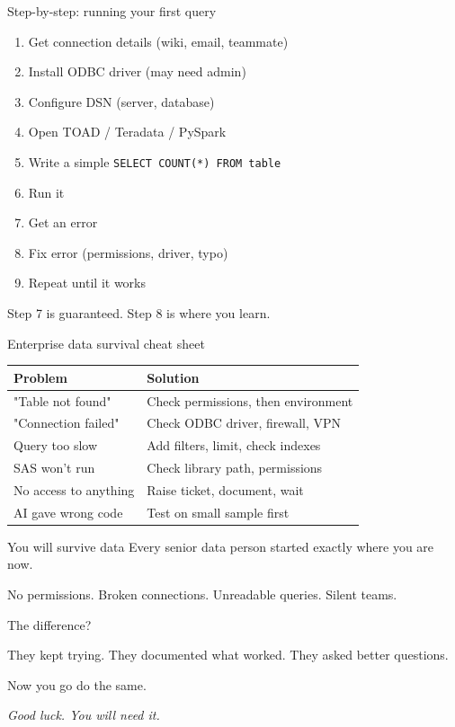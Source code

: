 \documentclass[aspectratio=169, 11pt]{beamer}
\begin{document}
	\begin{frame}{Step-by-step: running your first query}
		\tiny
		\begin{enumerate}
			\item Get connection details (wiki, email, teammate)
			\item Install ODBC driver (may need admin)
			\item Configure DSN (server, database)
			\item Open TOAD / Teradata / PySpark
			\item Write a simple \texttt{SELECT COUNT(*) FROM table}
			\item Run it
			\item Get an error
			\item Fix error (permissions, driver, typo)
			\item Repeat until it works
		\end{enumerate}
		\vspace{0.05cm}
		\tiny\alert{Step 7 is guaranteed. Step 8 is where you learn.}
	\end{frame}
	
	\begin{frame}{Enterprise data survival cheat sheet}
		\tiny
		\begin{tabular}{p{4cm} p{5cm}}
			\toprule
			\textbf{Problem} & \textbf{Solution} \\
			\midrule
			"Table not found" & Check permissions, then environment \\
			"Connection failed" & Check ODBC driver, firewall, VPN \\
			Query too slow & Add filters, limit, check indexes \\
			SAS won't run & Check library path, permissions \\
			No access to anything & Raise ticket, document, wait \\
			AI gave wrong code & Test on small sample first \\
			\bottomrule
		\end{tabular}
	\end{frame}
	
	\begin{frame}{You will survive data}
		\centering
		\tiny
		Every senior data person started exactly where you are now.
		
		No permissions. Broken connections. Unreadable queries. Silent teams.
		
		The difference?
		
		They kept trying. They documented what worked. They asked better questions.
		
		\vspace{0.2cm}
		\alert{Now you go do the same.}
		
		\vspace{0.2cm}
		\textit{Good luck. You will need it.}
	\end{frame}
	
\end{document}
